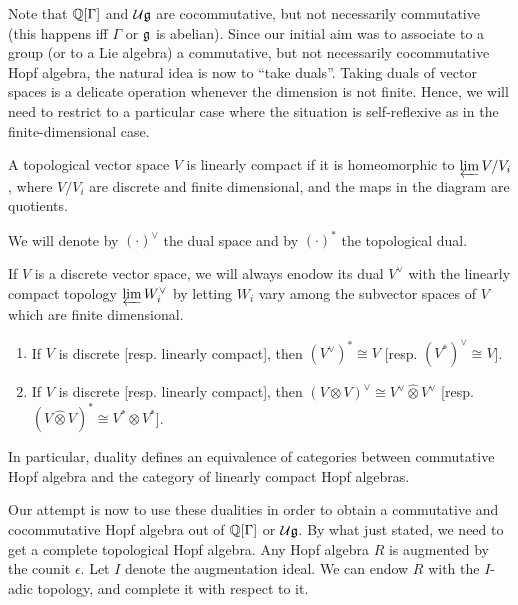 Note that $\mathbb{Q}[\Gamma]$ and $\mathcal{U}\mathfrak{g}$ are cocommutative, but not necessarily commutative (this happens iff $\Gamma$ or $\mathfrak{g}$ is abelian). Since our initial aim was to associate to a group (or to a Lie algebra) a commutative, but not necessarily cocommutative Hopf algebra, the natural idea is now to ``take duals''. Taking duals of vector spaces is a delicate operation whenever the dimension is not finite. Hence, we will need to restrict to a particular case where the situation is self-reflexive as in the finite-dimensional case.

\begin{defn}
A topological vector space $V$ is linearly compact if it is homeomorphic to $\varprojlim V/V_i$, where $V/V_i$ are discrete and finite dimensional, and the maps in the diagram are quotients.  
\end{defn}

We will denote by $(\cdot)^\vee$ the dual space and by $(\cdot)^*$ the topological dual.

\begin{exam}
If $V$ is a discrete vector space, we will always enodow its dual $V^\vee$ with the linearly compact topology $\varprojlim W_i^\vee$ by letting $W_i$ vary among the subvector spaces of $V$ which are finite dimensional.
\end{exam}

\begin{prop}
\begin{enumerate}
	\item If $V$ is discrete [resp. linearly compact], then $(V^\vee)^*\cong V$ [resp. $(V^*)^\vee\cong V$].
	\item If $V$ is discrete [resp. linearly compact], then $(V\otimes V)^\vee\cong V^\vee\hat{\otimes}V^\vee$ [resp. $(V\hat{\otimes}V)^*\cong V^*\otimes V^*$].
\end{enumerate}
\end{prop}

In particular, duality defines an equivalence of categories between commutative Hopf algebra and the category of linearly compact Hopf algebras.

Our attempt is now to use these dualities in order to obtain a commutative and cocommutative Hopf algebra out of $\mathbb{Q}[\Gamma]$ or $\mathcal{U}\mathfrak{g}$. By what just stated, we need to get a complete topological Hopf algebra. Any Hopf algebra $R$ is augmented by the counit $\epsilon$. Let $I$ denote the augmentation ideal. We can endow $R$ with the $I$-adic topology, and complete it with respect to it.

